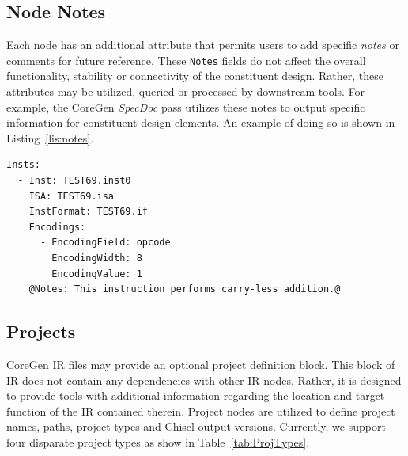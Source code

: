 \documentclass{article}
\begin{document}
\clearpage
\subsection{Node Notes}
\label{sec:NodeNotes}

Each node has an additional attribute that permits users to add specific \textit{notes} or comments 
for future reference.  These \texttt{Notes} fields do not affect the overall functionality, stability 
or connectivity of the constituent design.  Rather, these attributes may be utilized, queried or 
processed by downstream tools.  For example, the CoreGen \textit{SpecDoc} pass utilizes these notes
to output specific information for constituent design elements.  An example of doing so is shown 
in Listing~\ref{lis:notes}.

\vspace{0.125in}
\begin{lstlisting}[frame=single,style=base,caption={Sample Node Notes},captionpos=b,label={lis:notes}]
Insts:
  - Inst: TEST69.inst0
    ISA: TEST69.isa
    InstFormat: TEST69.if
    Encodings:
      - EncodingField: opcode
        EncodingWidth: 8
        EncodingValue: 1
    @Notes: This instruction performs carry-less addition.@
\end{lstlisting}


\clearpage
\subsection{Projects}
\label{sec:ProjectNodes}

CoreGen IR files may provide an optional project definition block.  This block of IR does not contain any 
dependencies with other IR nodes.  Rather,  it is designed to provide tools with additional information regarding 
the location and target function of the IR contained therein.  Project nodes are utilized to define project names, 
paths, project types and Chisel output versions.  Currently, we support four disparate project types as show in 
Table~\ref{tab:ProjTypes}.   
\end{document}
